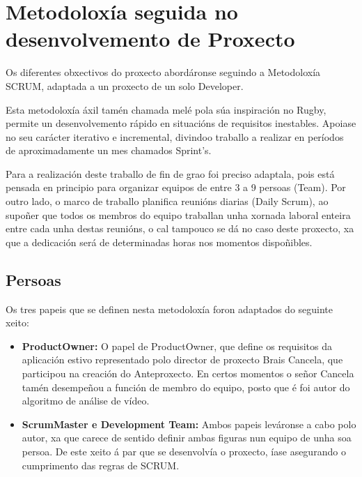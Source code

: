 \chapter{Metodoloxía seguida no desenvolvemento de Proxecto}

Os diferentes obxectivos do proxecto abordáronse seguindo a Metodoloxía SCRUM, adaptada a
un proxecto de un solo Developer.

Esta metodoloxía áxil tamén chamada melé pola súa inspiración no Rugby, permite un
desenvolvemento rápido en situacións de requisitos inestables. Apoiase no seu carácter 
iterativo e incremental, divindoo traballo a realizar en períodos de aproximadamente un mes
chamados Sprint's.

Para a realización deste traballo de fin de grao foi preciso adaptala, pois está pensada en 
principio para organizar equipos de entre 3 a 9 persoas (Team). Por outro lado, o marco de 
traballo planifica reunións diarias (Daily Scrum), ao supoñer que todos os membros do equipo 
traballan unha xornada laboral enteira entre cada unha destas reunións, o cal tampouco se dá 
no caso deste proxecto, xa que a dedicación será de determinadas horas nos momentos dispoñibles.

\section{Persoas}

Os tres papeis que se definen nesta metodoloxía \cite{la-guia-de-scrum} foron 
adaptados do seguinte xeito:
\begin{itemize}

	\item{\textbf{ProductOwner:}}
	O papel de ProductOwner, que define os requisitos da aplicación estivo representado 
	polo director de proxecto Brais Cancela, que participou na creación do Anteproxecto.
	En certos momentos o señor Cancela tamén desempeñou a función de membro do equipo, 
	posto que é foi autor do algoritmo de análise de vídeo. 

	\item{\textbf{ScrumMaster e Development Team:}}
	Ambos papeis leváronse a cabo polo autor, xa que carece de sentido definir ambas figuras
	nun equipo de unha soa persoa. De este xeito á par que se desenvolvía o proxecto, íase
	asegurando o cumprimento das regras de SCRUM.

\end{itemize}

\vspace{1cm}
